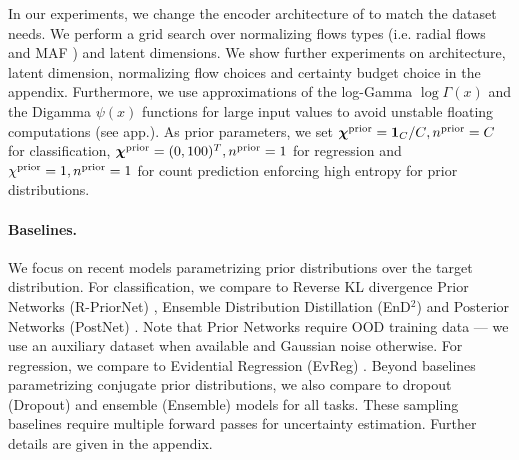 In our experiments, we change the encoder architecture of \NatPNacro{} to match the dataset needs. We perform a grid search over normalizing flows types (i.e. radial flows \citep{radialflow} and MAF \citep{made,maf}) and latent dimensions. We show further experiments on architecture, latent dimension, normalizing flow choices and certainty budget choice in the appendix. Furthermore, we use approximations of the log-Gamma $\log\Gamma(x)$ and the Digamma $\psi(x)$ functions for large input values to avoid unstable floating computations (see app.). As prior parameters, we set ${\bm{\chi}^\text{prior}=\bm{1}_{C}/C}, {n^\text{prior}=C}$ for classification, ${\bm{\chi}^\text{prior}=(0, 100)^T}, n^\text{prior}=1$ for regression and $\chi^\text{prior}=1, n^\text{prior}=1$ for count prediction enforcing high entropy for prior distributions.

\paragraph{Baselines.} We focus on recent models parametrizing prior distributions over the target distribution. For classification, we compare \NatPNacro{} to Reverse KL divergence Prior Networks (R-PriorNet) \citep{reverse-kl}, Ensemble Distribution Distillation (EnD$^2$) \citep{distribution-distillation} and Posterior Networks (PostNet) \citep{postnet}. Note that Prior Networks require OOD training data --- we use an auxiliary dataset when available and Gaussian noise otherwise. For regression, we compare to Evidential Regression (EvReg) \citep{evidential-regression}. Beyond baselines parametrizing conjugate prior distributions, we also compare to dropout (Dropout) \citep{dropout} and ensemble (Ensemble) \citep{ensembles} models for all tasks. These sampling baselines require multiple forward passes for uncertainty estimation. 
Further details are given in the appendix.


